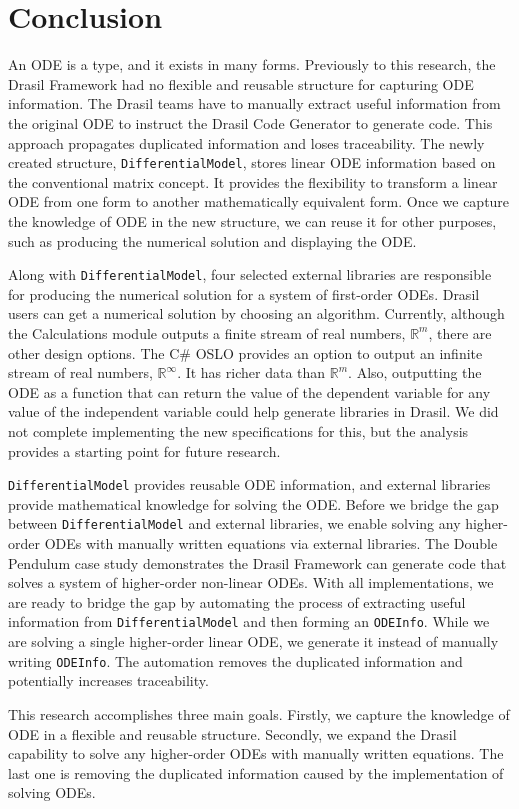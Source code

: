 \chapter{Conclusion}
An ODE is a type, and it exists in many forms. Previously to this research, the Drasil Framework had no flexible and reusable structure for capturing ODE information. The Drasil teams have to manually extract useful information from the original ODE to instruct the Drasil Code Generator to generate code. This approach propagates duplicated information and loses traceability. The newly created structure, \verb|DifferentialModel|, stores linear ODE information based on the conventional matrix concept. It provides the flexibility to transform a linear ODE from one form to another mathematically equivalent form. Once we capture the knowledge of ODE in the new structure, we can reuse it for other purposes, such as producing the numerical solution and displaying the ODE.

Along with \verb|DifferentialModel|, four selected external libraries are responsible for producing the numerical solution for a system of first-order ODEs. Drasil users can get a numerical solution by choosing an algorithm. Currently, although the Calculations module outputs a finite stream of real numbers, $\mathbb{R}^m$, there are other design options. The C\# OSLO provides an option to output an infinite stream of real numbers, $\mathbb{R}^{\infty}$. It has richer data than $\mathbb{R}^m$. Also, outputting the ODE as a function that can return the value of the dependent variable for any value of the independent variable could help generate libraries in Drasil. We did not complete implementing the new specifications for this, but the analysis provides a starting point for future research.

\verb|DifferentialModel| provides reusable ODE information, and external libraries provide mathematical knowledge for solving the ODE. Before we bridge the gap between \verb|DifferentialModel| and external libraries, we enable solving any higher-order ODEs with manually written equations via external libraries. The Double Pendulum case study demonstrates the Drasil Framework can generate code that solves a system of higher-order non-linear ODEs. With all implementations, we are ready to bridge the gap by automating the process of extracting useful information from \verb|DifferentialModel| and then forming an \verb|ODEInfo|. While we are solving a single higher-order linear ODE, we generate it instead of manually writing \verb|ODEInfo|. The automation removes the duplicated information and potentially increases traceability.

This research accomplishes three main goals. Firstly, we capture the knowledge of ODE in a flexible and reusable structure. Secondly, we expand the Drasil capability to solve any higher-order ODEs with manually written equations. The last one is removing the duplicated information caused by the implementation of solving ODEs.

